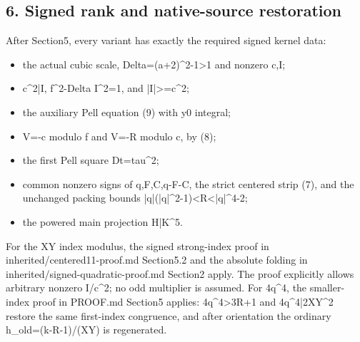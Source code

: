 \subsection{6. Signed rank and native-source restoration}



After Section5, every variant has exactly the required signed kernel data:



\begin{itemize}

\item the actual cubic scale, Delta=\allowbreak{}(a+\allowbreak{}2)\textasciicircum{}\allowbreak{}2-1\textgreater{}\allowbreak{}1 and nonzero c,I;

\item c\textasciicircum{}\allowbreak{}2|I, f\textasciicircum{}\allowbreak{}2-Delta I\textasciicircum{}\allowbreak{}2=\allowbreak{}1, and |I|\textgreater{}\allowbreak{}=\allowbreak{}c\textasciicircum{}\allowbreak{}2;

\item the auxiliary Pell equation (9) with y0 integral;

\item V=\allowbreak{}-c modulo f and V=\allowbreak{}-R modulo c, by (8);

\item the first Pell square Dt=\allowbreak{}tau\textasciicircum{}\allowbreak{}2;

\item common nonzero signs of q,F,C,q-F-C, the strict centered strip (7), and the unchanged packing bounds |q|(|q|\textasciicircum{}\allowbreak{}2-1)\textless{}\allowbreak{}R\textless{}\allowbreak{}|q|\textasciicircum{}\allowbreak{}4-2;

\item the powered main projection H|K\textasciicircum{}\allowbreak{}5.

\end{itemize}



For the XY index modulus, the signed strong-index proof in inherited/\allowbreak{}centered11-proof.md Section5.2 and the absolute folding in inherited/\allowbreak{}signed-quadratic-proof.md Section2 apply. The proof explicitly allows arbitrary nonzero I/\allowbreak{}c\textasciicircum{}\allowbreak{}2; no odd multiplier is assumed. For 4q\textasciicircum{}\allowbreak{}4, the smaller-index proof in PROOF.md Section5 applies: 4q\textasciicircum{}\allowbreak{}4\textgreater{}\allowbreak{}3R+\allowbreak{}1 and 4q\textasciicircum{}\allowbreak{}4|2XY\textasciicircum{}\allowbreak{}2 restore the same first-index congruence, and after orientation the ordinary h\_\allowbreak{}old=\allowbreak{}(k-R-1)/\allowbreak{}(XY) is regenerated.



